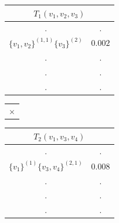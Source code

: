 \documentclass[12pt]{article}
\begin{document}
\begin{table}[!htb]
    \begin{minipage}{.3\linewidth}
      \centering
     \begin{tabular}{cc}
\multicolumn{2}{c}{$T_1(v_1,v_2,v_3)$}                           \\ \hline
\multicolumn{1}{|c}{.} & \multicolumn{1}{|c|}{.} \\ \hline
\multicolumn{1}{|l}{$\{v_1,v_2\}^{(1,1)} \{v_3\}^{(2)}$} & \multicolumn{1}{|l|}{$0.002$} \\ \hline
                             \multicolumn{1}{|c}{.} & \multicolumn{1}{|c|}{.} \\ \hline               
                   \multicolumn{1}{|c}{.} & \multicolumn{1}{|c|}{.} \\ \hline
                   \multicolumn{1}{|c}{.} & \multicolumn{1}{|c|}{.} \\ \hline        
\end{tabular}
    \end{minipage}%
    \begin{minipage}{.05\linewidth}

        \begin{tabular}{c}
     $ \times$\\
        \end{tabular}
    \end{minipage}%
     \begin{minipage}{.3\linewidth}
      \centering
     \begin{tabular}{cc}
\multicolumn{2}{c}{$T_2(v_1,v_3,v_4)$}                           \\ \hline
\multicolumn{1}{|c}{.} & \multicolumn{1}{|c|}{.} \\ \hline
\multicolumn{1}{|l}{$\{v_1\}^{(1)}\{v_3,v_4\}^{(2,1)}$} & \multicolumn{1}{|l|}{$0.008$} \\ \hline
                   \multicolumn{1}{|c}{.} & \multicolumn{1}{|c|}{.} \\ \hline               
                   \multicolumn{1}{|c}{.} & \multicolumn{1}{|c|}{.} \\ \hline
                   \multicolumn{1}{|c}{.} & \multicolumn{1}{|c|}{.} \\ \hline        
\end{tabular}
    \end{minipage}%
      \begin{minipage}{.06\linewidth}


\end{minipage}
\end{table}
\end{document}

